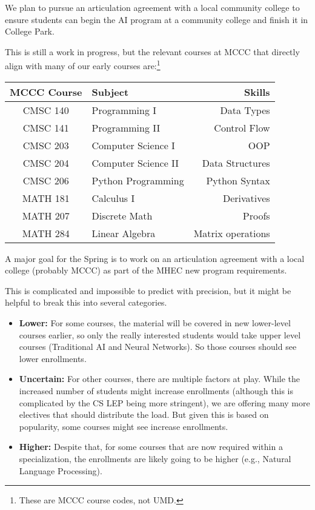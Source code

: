 
We plan to pursue an articulation agreement with a local community college to ensure students can begin the AI program at a community college and finish it in College Park.

This is still a work in progress, but the relevant courses at MCCC that directly align with many of our early courses are:\footnote{These are MCCC course codes, not UMD.}

\begin{center}
\begin{tabular}{clr}
\toprule
MCCC Course & Subject & Skills \\
\midrule
CMSC 140 & Programming I & Data Types \\
CMSC 141 & Programming II & Control Flow \\
CMSC 203 & Computer Science I & OOP \\
CMSC 204 & Computer Science II & Data Structures \\
CMSC 206 & Python Programming & Python Syntax \\
MATH 181 & Calculus I & Derivatives \\
MATH 207 & Discrete Math & Proofs \\
MATH 284 & Linear Algebra & Matrix operations \\
\bottomrule
\end{tabular}
\end{center}

A major goal for the Spring is to work on an articulation agreement with a local college (probably MCCC) as part of the MHEC new program requirements.


This is complicated and impossible to predict with precision, but it might be helpful to break this into several categories.

\begin{itemize}
    \item \textbf{Lower:} For some courses, the material will be covered in new lower-level courses earlier, so only the really interested students would take upper level \ai{} courses (Traditional AI and Neural Networks).  So those courses should see lower enrollments.
    \item \textbf{Uncertain:} For other courses, there are multiple factors at play.  While the increased number of students might increase enrollments (although this is complicated by the CS LEP being more stringent), we are offering many more electives that should distribute the load.  But given this is based on popularity, some courses might see increase enrollments.
    \item \textbf{Higher:} Despite that, for some courses that are now required within a specialization, the enrollments are likely going to be higher (e.g., Natural Language Processing).
\end{itemize}

